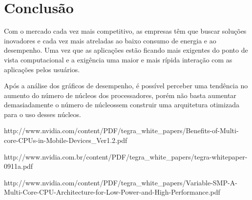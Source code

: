 \documentclass[article]{IEEEtran}
\begin{document}
\section{Conclus\~ao}
Com o mercado cada vez mais competitivo, as empresas t\^em que buscar solu\c{c}\~oes inovadores e cada vez mais atreladas ao baixo consumo de energia e ao desempenho. Uma vez que as aplica\c{c}\~oes est\~ao ficando mais exigentes do ponto de vista computacional e a exig\^encia uma maior e mais r\'ipida intera\c{c}\~ao com as aplica\c{c}\~oes pelos usu\'arios.

Ap\'os a an\'alise dos gr\'aficos de desempenho, \'e possível perceber uma tend\^encia no aumento do n\'umero de n\'ucleos dos processadores, por\'em n\~ao basta aumentar demasiadamente o n\'umero de n\'ucleossem construir uma arquitetura otimizada para o uso desses n\'ucleos.

\ifCLASSOPTIONcaptionsoff
\newpage
\fi



\begin{thebibliography}{eu}


http://www.nvidia.com/content/PDF/tegra\_white\_papers/Benefits-of-Multi-core-CPUs-in-Mobile-Devices\_Ver1.2.pdf

http://www.nvidia.com.br/content/PDF/tegra\_white\_papers/tegra-whitepaper-0911a.pdf

http://www.nvidia.com/content/PDF/tegra\_white\_papers/Variable-SMP-A-Multi-Core-CPU-Architecture-for-Low-Power-and-High-Performance.pdf

\end{thebibliography}
\end{document}
